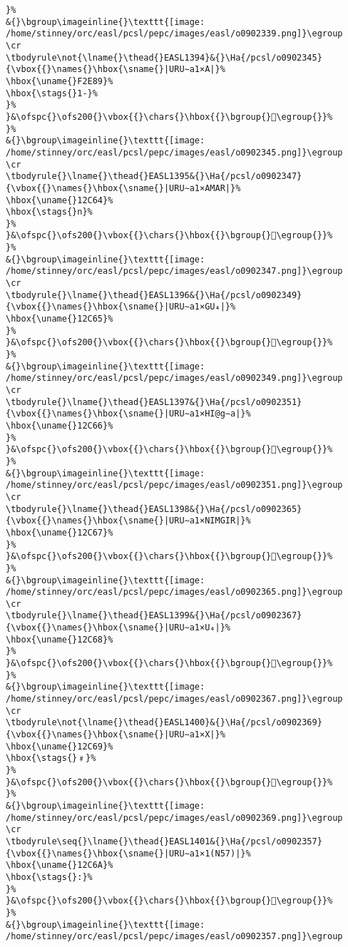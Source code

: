 \begin{verbatim}
}%
&{}\bgroup\imageinline{}\texttt{[image: /home/stinney/orc/easl/pcsl/pepc/images/easl/o0902339.png]}\egroup
\cr
\tbodyrule\not{\lname{}\thead{}EASL1394}&{}\Ha{/pcsl/o0902345}{\vbox{{}\names{}\hbox{\sname{}|URU∼a1×A|}%
\hbox{\uname{}F2E89}%
\hbox{\stags{}1-}%
}%
}&\ofspc{}\ofs200{}\vbox{{}\chars{}\hbox{{}\bgroup{}󲺉\egroup{}}%
}%
&{}\bgroup\imageinline{}\texttt{[image: /home/stinney/orc/easl/pcsl/pepc/images/easl/o0902345.png]}\egroup
\cr
\tbodyrule{}\lname{}\thead{}EASL1395&{}\Ha{/pcsl/o0902347}{\vbox{{}\names{}\hbox{\sname{}|URU∼a1×AMAR|}%
\hbox{\uname{}12C64}%
\hbox{\stags{}n}%
}%
}&\ofspc{}\ofs200{}\vbox{{}\chars{}\hbox{{}\bgroup{}𒱤\egroup{}}%
}%
&{}\bgroup\imageinline{}\texttt{[image: /home/stinney/orc/easl/pcsl/pepc/images/easl/o0902347.png]}\egroup
\cr
\tbodyrule{}\lname{}\thead{}EASL1396&{}\Ha{/pcsl/o0902349}{\vbox{{}\names{}\hbox{\sname{}|URU∼a1×GU₄|}%
\hbox{\uname{}12C65}%
}%
}&\ofspc{}\ofs200{}\vbox{{}\chars{}\hbox{{}\bgroup{}𒱥\egroup{}}%
}%
&{}\bgroup\imageinline{}\texttt{[image: /home/stinney/orc/easl/pcsl/pepc/images/easl/o0902349.png]}\egroup
\cr
\tbodyrule{}\lname{}\thead{}EASL1397&{}\Ha{/pcsl/o0902351}{\vbox{{}\names{}\hbox{\sname{}|URU∼a1×HI@g∼a|}%
\hbox{\uname{}12C66}%
}%
}&\ofspc{}\ofs200{}\vbox{{}\chars{}\hbox{{}\bgroup{}𒱦\egroup{}}%
}%
&{}\bgroup\imageinline{}\texttt{[image: /home/stinney/orc/easl/pcsl/pepc/images/easl/o0902351.png]}\egroup
\cr
\tbodyrule{}\lname{}\thead{}EASL1398&{}\Ha{/pcsl/o0902365}{\vbox{{}\names{}\hbox{\sname{}|URU∼a1×NIMGIR|}%
\hbox{\uname{}12C67}%
}%
}&\ofspc{}\ofs200{}\vbox{{}\chars{}\hbox{{}\bgroup{}𒱧\egroup{}}%
}%
&{}\bgroup\imageinline{}\texttt{[image: /home/stinney/orc/easl/pcsl/pepc/images/easl/o0902365.png]}\egroup
\cr
\tbodyrule{}\lname{}\thead{}EASL1399&{}\Ha{/pcsl/o0902367}{\vbox{{}\names{}\hbox{\sname{}|URU∼a1×U₄|}%
\hbox{\uname{}12C68}%
}%
}&\ofspc{}\ofs200{}\vbox{{}\chars{}\hbox{{}\bgroup{}𒱨\egroup{}}%
}%
&{}\bgroup\imageinline{}\texttt{[image: /home/stinney/orc/easl/pcsl/pepc/images/easl/o0902367.png]}\egroup
\cr
\tbodyrule\not{\lname{}\thead{}EASL1400}&{}\Ha{/pcsl/o0902369}{\vbox{{}\names{}\hbox{\sname{}|URU∼a1×X|}%
\hbox{\uname{}12C69}%
\hbox{\stags{}﹟}%
}%
}&\ofspc{}\ofs200{}\vbox{{}\chars{}\hbox{{}\bgroup{}𒱩\egroup{}}%
}%
&{}\bgroup\imageinline{}\texttt{[image: /home/stinney/orc/easl/pcsl/pepc/images/easl/o0902369.png]}\egroup
\cr
\tbodyrule\seq{}\lname{}\thead{}EASL1401&{}\Ha{/pcsl/o0902357}{\vbox{{}\names{}\hbox{\sname{}|URU∼a1×1(N57)|}%
\hbox{\uname{}12C6A}%
\hbox{\stags{}:}%
}%
}&\ofspc{}\ofs200{}\vbox{{}\chars{}\hbox{{}\bgroup{}𒱪\egroup{}}%
}%
&{}\bgroup\imageinline{}\texttt{[image: /home/stinney/orc/easl/pcsl/pepc/images/easl/o0902357.png]}\egroup

\end{verbatim}
